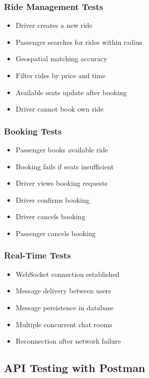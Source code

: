 \documentclass[12pt,a4paper]{article}
\begin{document}
\subsubsection{Ride Management Tests}
\begin{itemize}
    \item[$\square$] Driver creates a new ride
    \item[$\square$] Passenger searches for rides within radius
    \item[$\square$] Geospatial matching accuracy
    \item[$\square$] Filter rides by price and time
    \item[$\square$] Available seats update after booking
    \item[$\square$] Driver cannot book own ride
\end{itemize}

\subsubsection{Booking Tests}
\begin{itemize}
    \item[$\square$] Passenger books available ride
    \item[$\square$] Booking fails if seats insufficient
    \item[$\square$] Driver views booking requests
    \item[$\square$] Driver confirms booking
    \item[$\square$] Driver cancels booking
    \item[$\square$] Passenger cancels booking
\end{itemize}

\subsubsection{Real-Time Tests}
\begin{itemize}
    \item[$\square$] WebSocket connection established
    \item[$\square$] Message delivery between users
    \item[$\square$] Message persistence in database
    \item[$\square$] Multiple concurrent chat rooms
    \item[$\square$] Reconnection after network failure
\end{itemize}

\subsection{API Testing with Postman}
\end{document}
